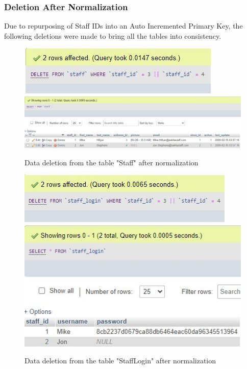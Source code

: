 \documentclass[openany]{article}
\begin{document}
	\subsubsection{Deletion After Normalization}
		Due to repurposing of Staff IDs into an Auto Incremented Primary Key, the following deletions were made to bring all the tables into consistency.
		\begin{figure}[H]
			\includegraphics[width=\textwidth]{staff1_delete_norm}
			\includegraphics[width=\textwidth]{staff2_delete_norm}
			\caption{Data deletion from the table "Staff" after normalization}
		\end{figure}
		\begin{figure}[H]
			\includegraphics[width=\textwidth]{stafflogin1_delete_norm}
			\includegraphics[width=\textwidth]{stafflogin2_delete_norm}
			\caption{Data deletion from the table "Staff\textunderscore Login" after normalization}
		\end{figure}
\end{document}
